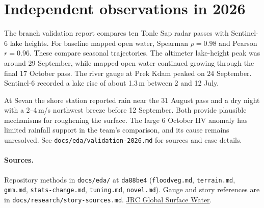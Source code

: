\documentclass[11pt]{article}
\begin{document}
\section{Independent observations in 2026}
The branch validation report compares ten Tonle Sap radar passes with
Sentinel-6 lake heights. For baseline mapped open water, Spearman
$\rho=0.98$ and Pearson $r=0.96$. These compare seasonal trajectories.
The altimeter lake-height peak was around 29 September, while mapped
open water continued growing through the final 17 October pass.
The river gauge at Prek Kdam peaked on 24 September. Sentinel-6
recorded a lake rise of about 1.3\,m between 2 and 12 July.

At Sevan the shore station reported rain near the 31 August pass
and a dry night with a 2--4\,m/s northwest breeze before 12 September.
Both provide plausible mechanisms for roughening the surface.
The large 6 October HV anomaly has limited rainfall support in the
team's comparison, and its cause remains unresolved.
See \texttt{docs/eda/validation-2026.md} for sources and case details.

\paragraph{Sources.}
Repository methods in \texttt{docs/eda/} at \texttt{da88be4}
(\texttt{floodveg.md}, \texttt{terrain.md}, \texttt{gmm.md},
\texttt{stats-change.md}, \texttt{tuning.md}, \texttt{novel.md}).
Gauge and story references are in \texttt{docs/research/story-sources.md}.
\href{https://global-surface-water.appspot.com/}{JRC Global Surface Water}.
\end{document}
